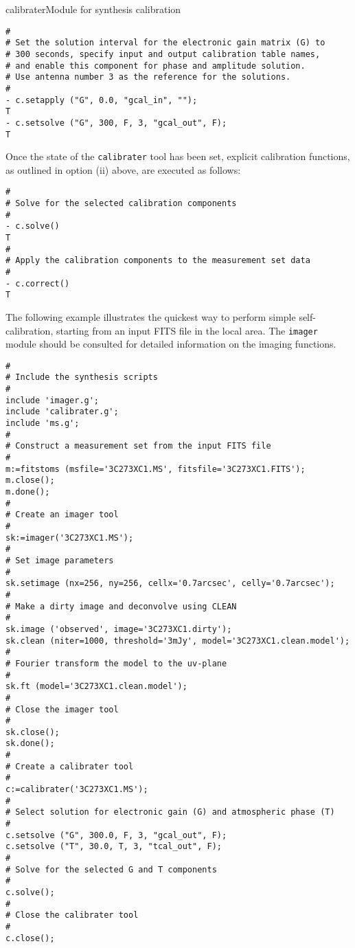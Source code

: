 \begin{ahmodule}{calibrater}{Module for synthesis calibration}
\begin{ahdescription}
\begin{verbatim}
#
# Set the solution interval for the electronic gain matrix (G) to
# 300 seconds, specify input and output calibration table names,
# and enable this component for phase and amplitude solution.
# Use antenna number 3 as the reference for the solutions.
#
- c.setapply ("G", 0.0, "gcal_in", "");
T
- c.setsolve ("G", 300, F, 3, "gcal_out", F);
T
\end{verbatim}

Once the state of the {\tt calibrater} tool has been set, explicit
calibration functions, as outlined in option (ii) above, are executed as
follows:

\begin{verbatim}
#
# Solve for the selected calibration components
#
- c.solve()
T
#
# Apply the calibration components to the measurement set data
#
- c.correct()
T
\end{verbatim}
\end{ahdescription}

\begin{ahexample}

The following example illustrates the quickest way to perform simple
self-calibration, starting from an input FITS file in the local
area. The {\tt imager} module should be consulted for detailed
information on the imaging functions.

\begin{verbatim}
#
# Include the synthesis scripts
#
include 'imager.g';
include 'calibrater.g';
include 'ms.g';
#
# Construct a measurement set from the input FITS file
#
m:=fitstoms (msfile='3C273XC1.MS', fitsfile='3C273XC1.FITS');
m.close(); 
m.done();
#
# Create an imager tool
#
sk:=imager('3C273XC1.MS');
#
# Set image parameters
#
sk.setimage (nx=256, ny=256, cellx='0.7arcsec', celly='0.7arcsec');
#
# Make a dirty image and deconvolve using CLEAN
#
sk.image ('observed', image='3C273XC1.dirty');
sk.clean (niter=1000, threshold='3mJy', model='3C273XC1.clean.model');
#
# Fourier transform the model to the uv-plane
#
sk.ft (model='3C273XC1.clean.model');
#
# Close the imager tool
#
sk.close();
sk.done();
#
# Create a calibrater tool
#
c:=calibrater('3C273XC1.MS');
#
# Select solution for electronic gain (G) and atmospheric phase (T)
#
c.setsolve ("G", 300.0, F, 3, "gcal_out", F);
c.setsolve ("T", 30.0, T, 3, "tcal_out", F);
#
# Solve for the selected G and T components
#
c.solve();
#
# Close the calibrater tool
#
c.close();
\end{verbatim}
\end{ahexample}





                                                                                              
\end{ahmodule}
